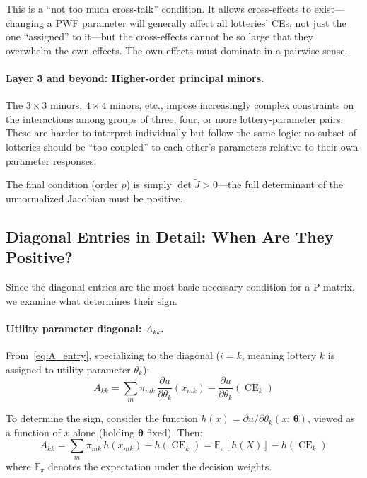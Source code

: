 \documentclass[11pt,a4paper]{article}
\theoremstyle{definition}
\newcommand{\E}{\mathbb{E}}
\newcommand{\btheta}{\boldsymbol{\theta}}
\DeclareMathOperator{\CE}{CE}
\begin{document}
This is a ``not too much cross-talk'' condition. It allows cross-effects to
exist---changing a PWF parameter will generally affect all lotteries' CEs,
not just the one ``assigned'' to it---but the cross-effects cannot be so
large that they overwhelm the own-effects. The own-effects must dominate in a
pairwise sense.

\paragraph{Layer 3 and beyond: Higher-order principal minors.}
The $3 \times 3$ minors, $4 \times 4$ minors, etc., impose increasingly
complex constraints on the interactions among groups of three, four, or more
lottery-parameter pairs. These are harder to interpret individually but
follow the same logic: no subset of lotteries should be ``too coupled'' to
each other's parameters relative to their own-parameter responses.

The final condition (order $p$) is simply $\det \widetilde{J} > 0$---the
full determinant of the unnormalized Jacobian must be positive.

\subsection{Diagonal Entries in Detail: When Are They Positive?}
\label{sec:diagonal_detail}

Since the diagonal entries are the most basic necessary condition for a
P-matrix, we examine what determines their sign.

\paragraph{Utility parameter diagonal: $A_{kk}$.}
From~\eqref{eq:A_entry}, specializing to the diagonal ($i = k$, meaning
lottery $k$ is assigned to utility parameter $\theta_k$):
\begin{equation}
    A_{kk} = \sum_{m} \pi_{mk} \,
    \frac{\partial u}{\partial \theta_k}(x_{mk}) -
    \frac{\partial u}{\partial \theta_k}(\CE_k)
\end{equation}

To determine the sign, consider the function
$h(x) = \partial u / \partial \theta_k(x;\, \btheta)$, viewed as a function
of $x$ alone (holding $\btheta$ fixed). Then:
\begin{equation}
    A_{kk} = \sum_m \pi_{mk}\, h(x_{mk}) - h(\CE_k)
    = \E_\pi[h(X)] - h(\CE_k)
\end{equation}
where $\E_\pi$ denotes the expectation under the decision weights.
\end{document}
